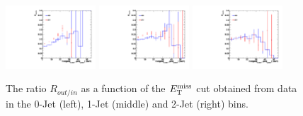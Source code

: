 \begin{figure}[!htbp]
\begin{center}
\includegraphics[width=0.3\textwidth]{figures/Routin_data_0Jet.pdf}
\includegraphics[width=0.3\textwidth]{figures/Routin_data_1Jet.pdf}
\includegraphics[width=0.3\textwidth]{figures/Routin_data_2Jet.pdf}
\caption{ The ratio $R_{out/in}$ as a function of the $E_\mathrm{T}^{\mathrm{miss}}$ cut obtained from data in the 
0-Jet (left), 1-Jet (middle) and 2-Jet (right) bins.} %
\label{fig:routin_met_data}
\end{center}
\end{figure}
